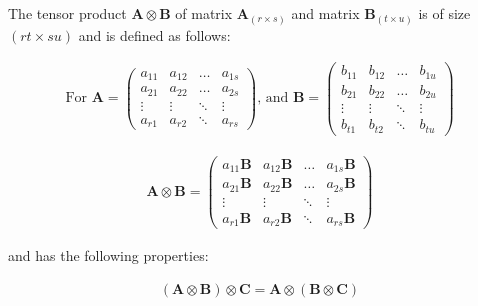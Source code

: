 \begin{definition}

The tensor product $\mathbf{A} \otimes \mathbf{B}$ of matrix $\mathbf{A}_{(r \times s)}$ and matrix $\mathbf{B}_{(t \times u)}$ is of size $(rt \times su)$ and is defined as follows:

\begin{align*}
\text{For }
\mathbf{A} = \begin{pmatrix}
    a_{11} & a_{12} & \dots  & a_{1s} \\
    a_{21} & a_{22} & \dots  & a_{2s} \\
    \vdots & \vdots & \ddots & \vdots \\
    a_{r1} & a_{r2} & \ddots & a_{rs}
\end{pmatrix}
\text{, and }
\mathbf{B} = \begin{pmatrix}
    b_{11} & b_{12} & \dots  & b_{1u} \\
    b_{21} & b_{22} & \dots  & b_{2u} \\
    \vdots & \vdots & \ddots & \vdots \\
    b_{t1} & b_{t2} & \ddots & b_{tu}
\end{pmatrix}
\end{align*}

\begin{align*}
\mathbf{A} \otimes \mathbf{B} = \begin{pmatrix}
    a_{11}\mathbf{B} & a_{12}\mathbf{B} & \dots  & a_{1s}\mathbf{B} \\
    a_{21}\mathbf{B} & a_{22}\mathbf{B} & \dots  & a_{2s}\mathbf{B} \\
    \vdots  & \vdots  & \ddots & \vdots  \\
    a_{r1}\mathbf{B} & a_{r2}\mathbf{B} & \ddots & a_{rs}\mathbf{B}
\end{pmatrix}
\end{align*}

\end{definition}

and has the following properties:


\begin{property}[Associativity]
\begin{align*}
  (\mathbf{A} \otimes \mathbf{B}) \otimes \mathbf{C} = \mathbf{A} \otimes (\mathbf{B} \otimes \mathbf{C})
\end{align*}
\end{property}

